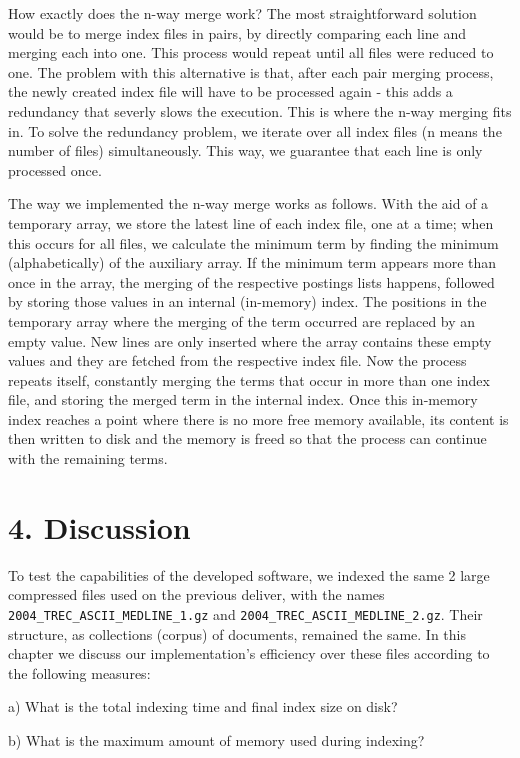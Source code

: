 \documentclass[12pt]{article}
\begin{document}
How exactly does the n-way merge work? 
The most straightforward solution would be to merge index files in pairs, 
by directly comparing each line and merging each into one. This process 
would repeat until all files were reduced to one.
The problem with this alternative is that, after each pair merging process, 
the newly created index file will have to be processed again - this adds a 
redundancy that severly slows the execution.
This is where the n-way merging fits in.
To solve the redundancy problem, we iterate over all index files (n means 
the number of files) simultaneously. 
This way, we guarantee that each line is only processed once.

The way we implemented the n-way merge works as follows.
With the aid of a temporary array, we store the latest line of each index 
file, one at a time; when this occurs for all files, we calculate the 
minimum term by finding the minimum (alphabetically) of the auxiliary array. 
If the minimum term appears more than once in the array, the merging of the 
respective postings lists happens, followed by storing those values in an 
internal (in-memory) index.
The positions in the temporary array where the merging of the term occurred
are replaced by an empty value.
New lines are only inserted where the array contains these empty values and 
they are fetched from the respective index file.
Now the process repeats itself, constantly merging the terms that occur in 
more than one index file, and storing the merged term in the internal index.
Once this in-memory index reaches a point where there is no more free memory 
available, its content is then written to disk and the memory is freed so 
that the process can continue with the remaining terms.

\newpage
\section*{4. Discussion}

To test the capabilities of the developed software, we indexed the same
2 large compressed files used on the previous deliver, with the names 
\texttt{2004\_TREC\_ASCII\_MEDLINE\_1.gz} and 
\texttt{2004\_TREC\_ASCII\_MEDLINE\_2.gz}.
Their structure, as collections (corpus) of documents, remained the same.
In this chapter we discuss our implementation's efficiency over these 
files according to the following measures:

a) What is the total indexing time and final index size on disk?

b) What is the maximum amount of memory used during indexing?
\end{document}
